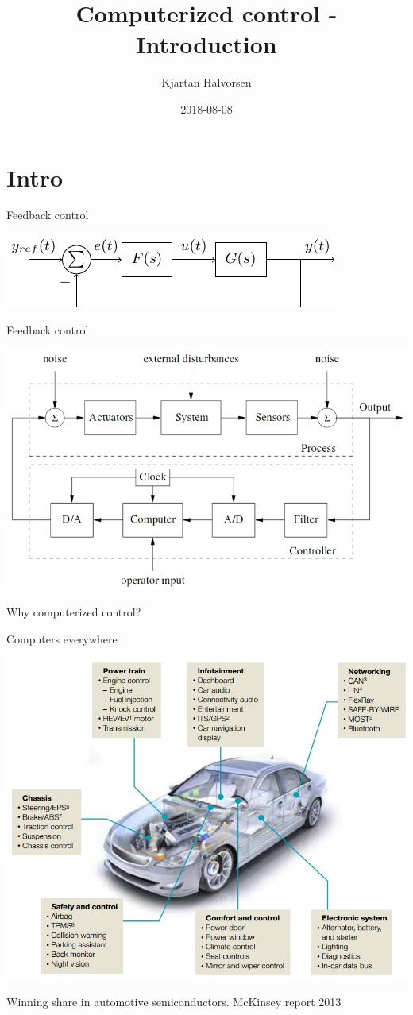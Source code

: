 \documentclass[presentation,aspectratio=169]{beamer}
\author{Kjartan Halvorsen}
\date{2018-08-08}
\title{Computerized control - Introduction}
\begin{document}
\maketitle


\section{Intro}
\label{sec-1}
\begin{frame}[label=sec-1-1]{Feedback control}
\begin{center}
\includegraphics[width=0.6\linewidth]{../figures/block1}
\end{center}
\end{frame}
\begin{frame}[label=sec-1-2]{Feedback control}
\begin{center}
\includegraphics[width=0.7\linewidth]{../figures/comp-contr-sys.png}
\end{center}
\end{frame}

\begin{frame}[label=sec-1-3]{Why computerized control?}
\end{frame}

\begin{frame}[label=sec-1-4]{Computers everywhere}
\begin{center}
\includegraphics[width=0.7\linewidth]{../figures/electronics-in-cars.png}
\end{center}
{\tiny Winning share in automotive semiconductors. McKinsey report 2013 } 
\end{frame}
\end{document}
